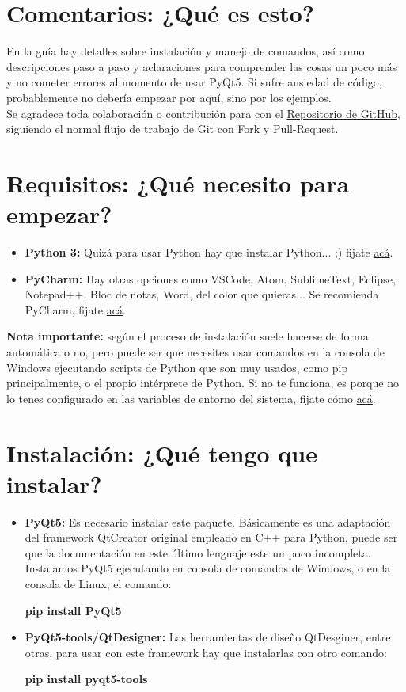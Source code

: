 \section{Comentarios: ¿Qu\'e es esto?}
En la gu\'ia hay detalles sobre instalaci\'on y manejo de comandos, as\'i como descripciones paso a paso y aclaraciones para comprender
las cosas un poco m\'as y no cometer errores al momento de usar PyQt5. Si sufre ansiedad de c\'odigo, probablemente no deber\'ia empezar por aqu\'i, sino por los ejemplos.
\\
Se agradece toda colaboraci\'on o contribuci\'on para con el \href{https://github.com/nicotrozzo/pyqt5-tutorials}{Repositorio de GitHub}, siguiendo el normal flujo de trabajo de Git con Fork y Pull-Request.

\section{Requisitos: ¿Qu\'e necesito para empezar?}

\begin{itemize}
    \item \textbf{Python 3:} Quiz\'a para usar Python hay que instalar Python... ;) fijate \href{https://www.python.org/}{ac\'a}.
    \item \textbf{PyCharm:} Hay otras opciones como VSCode, Atom, SublimeText, Eclipse, Notepad++, Bloc de notas, Word, del color que quieras... Se recomienda PyCharm, fijate \href{https://www.jetbrains.com/pycharm/}{ac\'a}.
\end{itemize}

\textbf{Nota importante:} seg\'un el proceso de instalaci\'on suele hacerse de forma autom\'atica o no, pero puede ser que necesites usar comandos en la consola de Windows ejecutando scripts de Python que son muy usados,
como pip principalmente, o el propio int\'erprete de Python. Si no te funciona, es porque no lo tenes configurado en las variables de entorno del sistema, fijate c\'omo \href{}{ac\'a}.

\section{Instalaci\'on: ¿Qu\'e tengo que instalar?}
\begin{itemize}
    \item \textbf{PyQt5:} Es necesario instalar este paquete. B\'asicamente es una adaptaci\'on del framework QtCreator original empleado en C++ para Python, puede ser que la documentaci\'on en este \'ultimo lenguaje este un poco incompleta.
    Instalamos PyQt5 ejecutando en consola de comandos de Windows, o en la consola de Linux, el comando:
    \begin{center}
        \textbf{pip install PyQt5}
    \end{center}

    \item \textbf{PyQt5-tools/QtDesigner:} Las herramientas de dise\~no QtDesginer, entre otras, para usar con este framework hay que instalarlas con otro comando:
    \begin{center}
        \textbf{pip install pyqt5-tools}
    \end{center}
\end{itemize}

